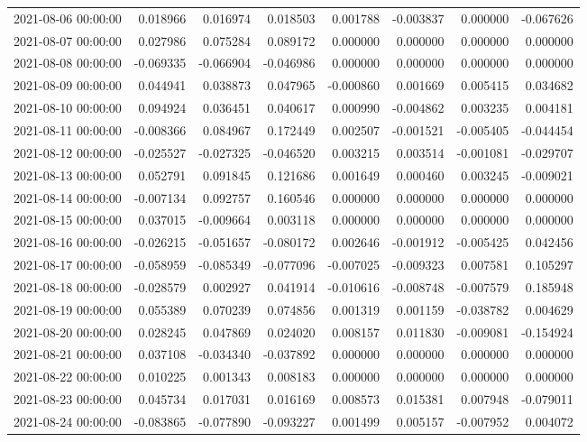 \begin{tabular}{lrrrrrrr}
2021-08-06 00:00:00 & 0.018966 & 0.016974 & 0.018503 & 0.001788 & -0.003837 & 0.000000 & -0.067626 \\
2021-08-07 00:00:00 & 0.027986 & 0.075284 & 0.089172 & 0.000000 & 0.000000 & 0.000000 & 0.000000 \\
2021-08-08 00:00:00 & -0.069335 & -0.066904 & -0.046986 & 0.000000 & 0.000000 & 0.000000 & 0.000000 \\
2021-08-09 00:00:00 & 0.044941 & 0.038873 & 0.047965 & -0.000860 & 0.001669 & 0.005415 & 0.034682 \\
2021-08-10 00:00:00 & 0.094924 & 0.036451 & 0.040617 & 0.000990 & -0.004862 & 0.003235 & 0.004181 \\
2021-08-11 00:00:00 & -0.008366 & 0.084967 & 0.172449 & 0.002507 & -0.001521 & -0.005405 & -0.044454 \\
2021-08-12 00:00:00 & -0.025527 & -0.027325 & -0.046520 & 0.003215 & 0.003514 & -0.001081 & -0.029707 \\
2021-08-13 00:00:00 & 0.052791 & 0.091845 & 0.121686 & 0.001649 & 0.000460 & 0.003245 & -0.009021 \\
2021-08-14 00:00:00 & -0.007134 & 0.092757 & 0.160546 & 0.000000 & 0.000000 & 0.000000 & 0.000000 \\
2021-08-15 00:00:00 & 0.037015 & -0.009664 & 0.003118 & 0.000000 & 0.000000 & 0.000000 & 0.000000 \\
2021-08-16 00:00:00 & -0.026215 & -0.051657 & -0.080172 & 0.002646 & -0.001912 & -0.005425 & 0.042456 \\
2021-08-17 00:00:00 & -0.058959 & -0.085349 & -0.077096 & -0.007025 & -0.009323 & 0.007581 & 0.105297 \\
2021-08-18 00:00:00 & -0.028579 & 0.002927 & 0.041914 & -0.010616 & -0.008748 & -0.007579 & 0.185948 \\
2021-08-19 00:00:00 & 0.055389 & 0.070239 & 0.074856 & 0.001319 & 0.001159 & -0.038782 & 0.004629 \\
2021-08-20 00:00:00 & 0.028245 & 0.047869 & 0.024020 & 0.008157 & 0.011830 & -0.009081 & -0.154924 \\
2021-08-21 00:00:00 & 0.037108 & -0.034340 & -0.037892 & 0.000000 & 0.000000 & 0.000000 & 0.000000 \\
2021-08-22 00:00:00 & 0.010225 & 0.001343 & 0.008183 & 0.000000 & 0.000000 & 0.000000 & 0.000000 \\
2021-08-23 00:00:00 & 0.045734 & 0.017031 & 0.016169 & 0.008573 & 0.015381 & 0.007948 & -0.079011 \\
2021-08-24 00:00:00 & -0.083865 & -0.077890 & -0.093227 & 0.001499 & 0.005157 & -0.007952 & 0.004072 \\

\end{tabular}
